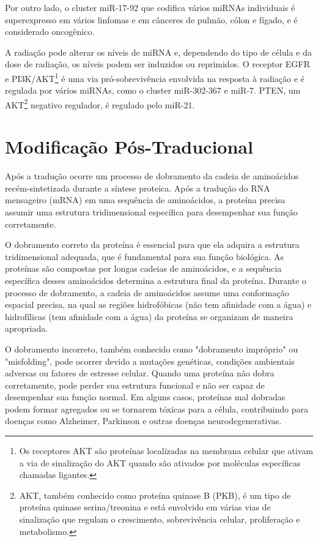 \documentclass[11pt,a4paper]{article}
\begin{document}
		Por outro lado, o cluster miR-17-92 que codifica vários miRNAs individuais é superexpresso em vários linfomas e em cânceres de pulmão, cólon e fígado, e é considerado oncogênico.
		
		A radiação pode alterar os níveis de miRNA e, dependendo do tipo de célula e da dose de radiação, os níveis podem ser induzidos ou reprimidos. O receptor EGFR e PI3K/AKT\footnote{Os receptores AKT são proteínas localizadas na membrana celular que ativam a via de sinalização do AKT quando são ativados por moléculas específicas chamadas ligantes. } é uma via pró-sobrevivência envolvida na resposta à radiação e é regulada por vários miRNAs, como o cluster miR-302-367 e miR-7. PTEN, um AKT\footnote{AKT, também conhecido como proteína quinase B (PKB), é um tipo de proteína quinase serina/treonina e está envolvido em várias vias de sinalização que regulam o crescimento, sobrevivência celular, proliferação e metabolismo.} negativo regulador, é regulado pelo miR-21.

	\section{Modificação Pós-Traducional}

		Após a tradução ocorre um processo de dobramento da cadeia de aminoácidos recém-sintetizada durante a síntese proteica. Após a tradução do RNA mensageiro (mRNA) em uma sequência de aminoácidos, a proteína precisa assumir uma estrutura tridimensional específica para desempenhar sua função corretamente.

		O dobramento correto da proteína é essencial para que ela adquira a estrutura tridimensional adequada, que é fundamental para sua função biológica. As proteínas são compostas por longas cadeias de aminoácidos, e a sequência específica desses aminoácidos determina a estrutura final da proteína. Durante o processo de dobramento, a cadeia de aminoácidos assume uma conformação espacial precisa, na qual as regiões hidrofóbicas (não tem afinidade com a água)  e hidrofílicas (tem afinidade com a água) da proteína se organizam de maneira apropriada.
		
		O dobramento incorreto, também conhecido como "dobramento impróprio" ou "misfolding", pode ocorrer devido a mutações genéticas, condições ambientais adversas ou fatores de estresse celular. Quando uma proteína não dobra corretamente, pode perder sua estrutura funcional e não ser capaz de desempenhar sua função normal. Em alguns casos, proteínas mal dobradas podem formar agregados ou se tornarem tóxicas para a célula, contribuindo para doenças como Alzheimer, Parkinson e outras doenças neurodegenerativas.
\end{document}
